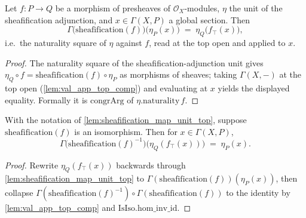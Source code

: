 \begin{lemma}
  \label{lem:sheafification_map_unit_top}
  Let \(f : P \to Q\) be a morphism of presheaves of \(\mathcal{O}_X\)-modules,
  \(\eta\) the unit of the sheafification adjunction, and \(x \in \Gamma(X, P)\) a
  global section. Then
  \[
    \Gamma\bigl(\mathrm{sheafification}(f)\bigr)\bigl(\eta_P(x)\bigr)
      \;=\; \eta_Q\bigl(f_{\top}(x)\bigr),
  \]
  i.e.\ the naturality square of \(\eta\) against \(f\), read at the top open and
  applied to \(x\).
\end{lemma}

\begin{proof}


  The naturality square of the sheafification-adjunction unit gives
  \(\eta_Q \circ f = \mathrm{sheafification}(f) \circ \eta_P\) as morphisms of
  sheaves; taking \(\Gamma(X,-)\) at the top open (\cref{lem:val_app_top_comp})
  and evaluating at \(x\) yields the displayed equality. Formally it is
  \(\mathrm{congrArg}\) of \(\eta.\mathrm{naturality}\,f\).
\end{proof}

\begin{lemma}
  \label{lem:sheafification_map_unit_top_inv}
  With the notation of \cref{lem:sheafification_map_unit_top}, suppose
  \(\mathrm{sheafification}(f)\) is an isomorphism. Then for \(x \in \Gamma(X,P)\),
  \[
    \Gamma\bigl(\mathrm{sheafification}(f)^{-1}\bigr)
      \bigl(\eta_Q(f_{\top}(x))\bigr) \;=\; \eta_P(x).
  \]
\end{lemma}

\begin{proof}


  Rewrite \(\eta_Q(f_{\top}(x))\) backwards through
  \cref{lem:sheafification_map_unit_top} to
  \(\Gamma(\mathrm{sheafification}(f))(\eta_P(x))\), then collapse
  \(\Gamma(\mathrm{sheafification}(f)^{-1}) \circ \Gamma(\mathrm{sheafification}(f))\)
  to the identity by \cref{lem:val_app_top_comp} and \(\mathrm{IsIso.hom\_inv\_id}\).
\end{proof}

